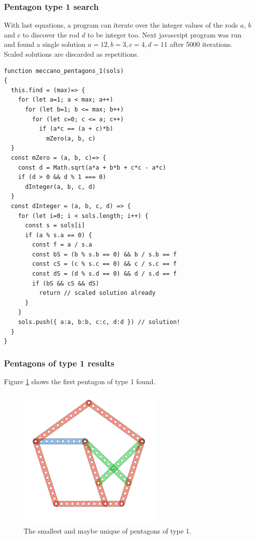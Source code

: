 \documentclass[11pt]{article}
\begin{document}
\subsubsection{Pentagon type 1 search}

With last equations, a program can iterate over the integer values of the rods $a$, $b$ and $c$ to discover the rod $d$ to be integer too. Next javascript program was run and found a single solution $a = 12, b = 3, c = 4, d = 11$ after 5000 iterations. Scaled solutions are discarded as repetitions.

\begin{lstlisting}
function meccano_pentagons_1(sols)
{
  this.find = (max)=> {
    for (let a=1; a < max; a++)
      for (let b=1; b <= max; b++)
        for (let c=0; c <= a; c++)
          if (a*c == (a + c)*b)
            mZero(a, b, c)
  }
  const mZero = (a, b, c)=> {
    const d = Math.sqrt(a*a + b*b + c*c - a*c)
    if (d > 0 && d % 1 === 0)
      dInteger(a, b, c, d)
  }
  const dInteger = (a, b, c, d) => {
    for (let i=0; i < sols.length; i++) {
      const s = sols[i]
      if (a % s.a == 0) {
        const f = a / s.a
        const bS = (b % s.b == 0) && b / s.b == f
        const cS = (c % s.c == 0) && c / s.c == f
        const dS = (d % s.d == 0) && d / s.d == f
        if (bS && cS && dS)
          return // scaled solution already
      }
    }
    sols.push({ a:a, b:b, c:c, d:d }) // solution!
  }
}

\end{lstlisting}

\subsubsection{Pentagons of type 1 results}

Figure \ref{pentagon-12a} shows the first pentagon of type 1 found.

\begin{figure}
\centering
\includegraphics[width=7cm]{figs/pentagon-12a}
\caption{The smallest and maybe unique of pentagons of type 1.}
\label{pentagon-12a}
\end{figure}
\end{document}
